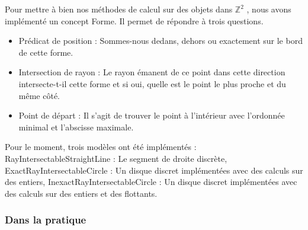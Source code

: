 Pour mettre à bien nos méthodes de calcul sur des objets dans $\mathbb{Z}^{2}$ , nous avons implémenté un concept Forme. Il permet de répondre à trois questions.

\begin{itemize}
  \item Prédicat de position : Sommes-nous dedans, dehors ou exactement sur le bord de cette forme.
  \item Intersection de rayon : Le rayon émanent de ce point dans cette direction intersecte-t-il cette forme et si oui, quelle est le point le plus proche et du même côté.
  \item Point de départ : Il s'agit de trouver le point à l'intérieur avec l'ordonnée minimal et l'abscisse maximale. 
\end{itemize}

Pour le moment, trois modèles ont été implémentés : RayIntersectableStraightLine : Le segment de droite discrète, ExactRayIntersectableCircle : Un disque discret implémentées avec des calculs sur des entiers, InexactRayIntersectableCircle : Un disque discret implémentées avec des calculs sur des entiers et des flottants.


\subsubsection{Dans la pratique}


